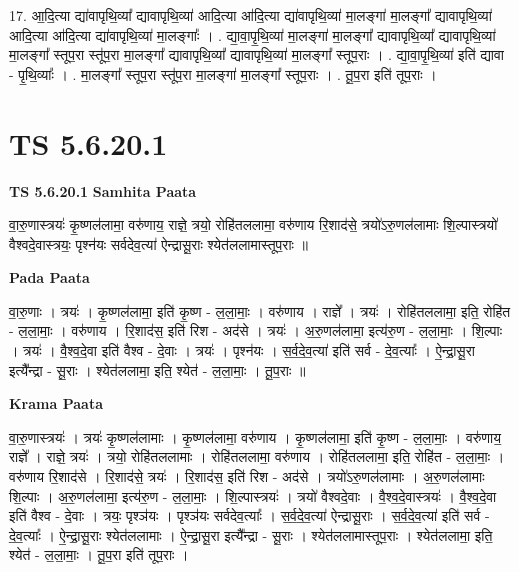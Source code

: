 \documentclass[17pt]{extarticle}
\begin{document}
17. आ॒दि॒त्या द्या॑वापृथि॒व्या᳚ द्यावापृथि॒व्या॑ आदि॒त्या आ॑दि॒त्या द्या॑वापृथि॒व्या॑ मा॒लङ्गा॑ मा॒लङ्गा᳚ द्यावापृथि॒व्या॑ आदि॒त्या आ॑दि॒त्या द्या॑वापृथि॒व्या॑ मा॒लङ्गाः᳚ । . द्या॒वा॒पृ॒थि॒व्या॑ मा॒लङ्गा॑ मा॒लङ्गा᳚ द्यावापृथि॒व्या᳚ द्यावापृथि॒व्या॑ मा॒लङ्गा᳚ स्तूप॒रा स्तू॑प॒रा मा॒लङ्गा᳚ द्यावापृथि॒व्या᳚ द्यावापृथि॒व्या॑ मा॒लङ्गा᳚ स्तूप॒राः । . द्या॒वा॒पृ॒थि॒व्या॑ इति॑ द्यावा - पृ॒थि॒व्याः᳚ । . मा॒लङ्गा᳚ स्तूप॒रा स्तू॑प॒रा मा॒लङ्गा॑ मा॒लङ्गा᳚ स्तूप॒राः । . तू॒प॒रा इति॑ तूप॒राः । \newline
\pagebreak
{}

\section{ TS 5.6.20.1 }

\textbf{TS 5.6.20.1 } \newline
\textbf{Samhita Paata} \newline

वा॒रु॒णास्त्रयः॑ कृ॒ष्णल॑लामा॒ वरु॑णाय॒ राज्ञे॒ त्रयो॒ रोहि॑तललामा॒ वरु॑णाय रि॒शाद॑से॒ त्रयो॑ऽरु॒णल॑लामाः शि॒ल्पास्त्रयो॑ वैश्वदे॒वास्त्रयः॒ पृश्न॑यः सर्वदेव॒त्या॑ ऐन्द्रासू॒राः श्येत॑ललामास्तूप॒राः ॥ \newline

\textbf{Pada Paata} \newline

वा॒रु॒णाः । त्रयः॑ । कृ॒ष्णल॑लामा॒ इति॑ कृ॒ष्ण - ल॒ला॒माः॒ । वरु॑णाय । राज्ञे᳚ । त्रयः॑ । रोहि॑तललामा॒ इति॒ रोहि॑त - ल॒ला॒माः॒ । वरु॑णाय । रि॒शाद॑स॒ इति॑ रिश - अद॑से । त्रयः॑ । अ॒रु॒णल॑लामा॒ इत्य॑रु॒ण - ल॒ला॒माः॒ । शि॒ल्पाः । त्रयः॑ । वै॒श्व॒दे॒वा इति॑ वैश्व - दे॒वाः । त्रयः॑ । पृश्न॑यः । स॒र्व॒दे॒व॒त्या॑ इति॑ सर्व - दे॒व॒त्याः᳚ । ऐ॒न्द्रा॒सू॒रा इत्यै᳚न्द्रा - सू॒राः । श्येत॑ललामा॒ इति॒ श्येत॑ - ल॒ला॒माः॒ । तू॒प॒राः ॥  \newline


\textbf{Krama Paata} \newline

वा॒रु॒णास्त्रयः॑ । त्रयः॑ कृ॒ष्णल॑लामाः । कृ॒ष्णल॑लामा॒ वरु॑णाय । कृ॒ष्णल॑लामा॒ इति॑ कृ॒ष्ण - ल॒ला॒माः॒ । वरु॑णाय॒ राज्ञे᳚ । राज्ञे॒ त्रयः॑ । त्रयो॒ रोहि॑तललामाः । रोहि॑तललामा॒ वरु॑णाय । रोहि॑तललामा॒ इति॒ रोहि॑त - ल॒ला॒माः॒ । वरु॑णाय रि॒शाद॑से । रि॒शाद॑से॒ त्रयः॑ । रि॒शाद॑स॒ इति॑ रिश - अद॑से । त्रयो॑ऽरु॒णल॑लामाः । अ॒रु॒णल॑लामाः शि॒ल्पाः । अ॒रु॒णल॑लामा॒ इत्य॑रु॒ण - ल॒ला॒माः॒ । शि॒ल्पास्त्रयः॑ । त्रयो॑ वैश्वदे॒वाः । वै॒श्व॒दे॒वास्त्रयः॑ । वै॒श्व॒दे॒वा इति॑ वैश्व - दे॒वाः । त्रयः॒ पृश्ञ॑यः । पृश्ञ॑यः सर्वदेव॒त्याः᳚ । स॒र्व॒दे॒व॒त्या॑ ऐन्द्रासू॒राः । स॒र्व॒दे॒व॒त्या॑ इति॑ सर्व - दे॒व॒त्याः᳚ । ऐ॒न्द्रा॒सू॒राः श्येत॑ललामाः । ऐ॒न्द्रा॒सू॒रा इत्यै᳚न्द्रा - सू॒राः । श्येत॑ललामास्तूप॒राः । श्येत॑ललामा॒ इति॒ श्येत॑ - ल॒ला॒माः॒ । तू॒प॒रा इति॑ तूप॒राः । \newline
\end{document}
